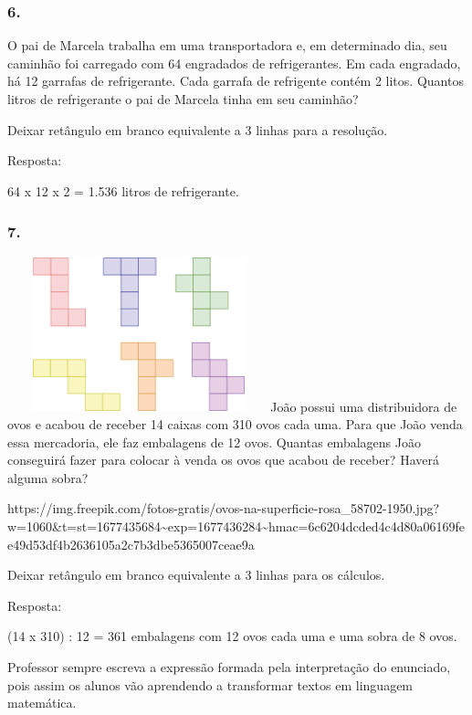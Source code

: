 \begin{enumerate}
\begin{escolha}
\subsubsection{6.}\label{section-18}

O pai de Marcela trabalha em uma transportadora e, em determinado
dia, seu caminhão foi carregado com 64 engradados de refrigerantes.
Em cada engradado, há 12 garrafas de refrigerante. Cada garrafa de refrigente
contém 2 litos. Quantos litros de
refrigerante o pai de Marcela tinha em seu caminhão?

Deixar retângulo em branco equivalente a 3 linhas para a resolução.

Resposta:

64 x 12 x 2 = 1.536 litros de refrigerante.

\subsubsection{7.}\label{section-19}

\includegraphics[width=3.00278in,height=1.75833in]{media/image36.png}João
possui uma distribuidora de ovos e acabou de receber 14 caixas com 310
ovos cada uma. Para que João venda essa mercadoria, ele faz embalagens
de 12 ovos. Quantas embalagens João conseguirá fazer para
colocar à venda os ovos que acabou de receber? Haverá alguma sobra?

https://img.freepik.com/fotos-gratis/ovos-na-superficie-rosa\_58702-1950.jpg?w=1060\&t=st=1677435684\textasciitilde{}exp=1677436284\textasciitilde{}hmac=6c6204dcded4c4d80a06169fee49d53df4b2636105a2c7b3dbe5365007ceae9a

Deixar retângulo em branco equivalente a 3 linhas para os cálculos.

Resposta:

(14 x 310) : 12 = 361 embalagens com 12 ovos cada uma e uma sobra de 8
ovos.

Professor sempre escreva a expressão formada pela interpretação do
enunciado, pois assim os alunos vão aprendendo a transformar textos em linguagem
matemática.


\end{escolha}
\end{enumerate}
